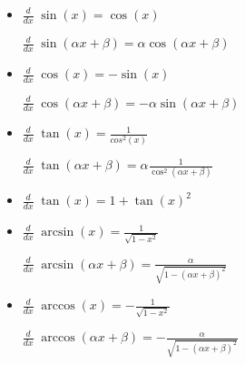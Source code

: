 \begin{itemize}[leftmargin=*]
	\item 
	\begin{minipage}{0.4\columnwidth}
		$\frac{d}{dx}\; \sin(x) = \cos(x)$	
	\end{minipage}
	\begin{minipage}{0.55\columnwidth}
		$\frac{d}{dx}\; \sin(\alpha x + \beta) = \alpha \cos(\alpha x + \beta)$	
	\end{minipage}
	
	
	\item 
	\begin{minipage}{0.4\columnwidth}
		$\frac{d}{dx}\; \cos(x) = -\sin(x)$
	\end{minipage}
	\begin{minipage}{0.55\columnwidth}
		$\frac{d}{dx}\; \cos(\alpha x + \beta) = -\alpha \sin(\alpha x + \beta)$
	\end{minipage}

	\item 
	\begin{minipage}{0.4\columnwidth}
		$\frac{d}{dx}\; \tan(x) = \frac{1}{cos^2(x)}$	
	\end{minipage}
	\begin{minipage}{0.55\columnwidth}
		$\frac{d}{dx}\; \tan(\alpha x + \beta) = \alpha \frac{1}{\cos^2(\alpha x + \beta)}$	
	\end{minipage}
	
	\item $\frac{d}{dx}\; \tan(x) = 1 + \tan(x)^2$

	\item 
	\begin{minipage}{0.4\columnwidth}
		$\frac{d}{dx}\; \arcsin(x) = \frac{1}{\sqrt{1-x^2}}$	
	\end{minipage}
	\begin{minipage}{0.55\columnwidth}
		$\frac{d}{dx}\; \arcsin(\alpha x + \beta) = \frac{\alpha}{\sqrt{1-(\alpha x + \beta)^2}}$
	\end{minipage}
		
	\item 
	\begin{minipage}{0.4\columnwidth}
		$\frac{d}{dx}\; \arccos(x) = -\frac{1}{\sqrt{1-x^2}}$ 
	\end{minipage}
	\begin{minipage}{0.55\columnwidth}
		$\frac{d}{dx}\; \arccos(\alpha x + \beta) = -\frac{\alpha}{\sqrt{1 - (\alpha x + \beta)^2}}$
	\end{minipage}
	

\end{itemize}
